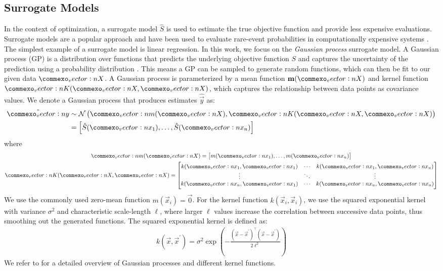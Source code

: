 \subsection{Surrogate Models}
In the context of optimization, a surrogate model $\hat{S}$ is used to estimate the true objective function and provide less expensive evaluations.
Surrogate models are a popular approach and have been used to evaluate rare-event probabilities in computationally expensive systems \cite{li2010evaluation,li2011efficient}.
The simplest example of a surrogate model is linear regression.
In this work, we focus on the \textit{Gaussian process} surrogate model.
A Gaussian process (GP) is a distribution over functions that predicts the underlying objective function $S$ and captures the uncertainty of the prediction using a probability distribution \cite{kochenderfer2019algorithms}.
This means a GP can be sampled to generate random functions, which can then be fit to our given data $\mat{X}$.
A Gaussian process is parameterized by a mean function $\m(\mat{X})$ and kernel function $\mat{K}(\mat{X},\mat{X})$, which captures the relationship between data points as covariance values.
We denote a Gaussian process that produces estimates $\hat{\vec{y}}$ as:
\begin{align*}
\hat{\vec{y}} &\sim\mathcal{N}\left(\vec{m}(\mat{X}),\vec{K}(\mat{X},\mat{X})\right)\\
        &= \begin{bmatrix} %
            \hat{S}(\vec{x}_1), \ldots, \hat{S}(\vec{x}_n)
        \end{bmatrix}
\end{align*}
where
\begin{gather*}
\vec{m}(\mat{X}) = \begin{bmatrix} m(\vec{x}_1), \ldots, m(\vec{x}_n) \end{bmatrix}\\
\vec{K}(\mat{X}, \mat{X}) = \begin{bmatrix}
         k(\vec{x}_1, \vec{x}_1) & \cdots & k(\vec{x}_1, \vec{x}_n)\\
         \vdots & \ddots & \vdots\\
         k(\vec{x}_n, \vec{x}_1) & \cdots & k(\vec{x}_n, \vec{x}_n)
     \end{bmatrix}
\end{gather*}
We use the commonly used zero-mean function $m(\vec{x}_i) = \vec{0}$.
For the kernel function $k(\vec{x}_i, \vec{x}_i)$, we use the squared exponential kernel with variance $\sigma^2$ and characteristic scale-length $\ell$, where larger $\ell$ values increase the correlation between successive data points, thus smoothing out the generated functions. The squared exponential kernel is defined as:
\begin{align*}
k(\vec{x},\vec{x}^\prime) = \sigma^2\exp\left(- \frac{(\vec{x} - \vec{x}^\prime)^\top(\vec{x} - \vec{x}^\prime)}{2\ell^2}\right)
\end{align*}
We refer to \cite{kochenderfer2019algorithms} for a detailed overview of Gaussian processes and different kernel functions.



